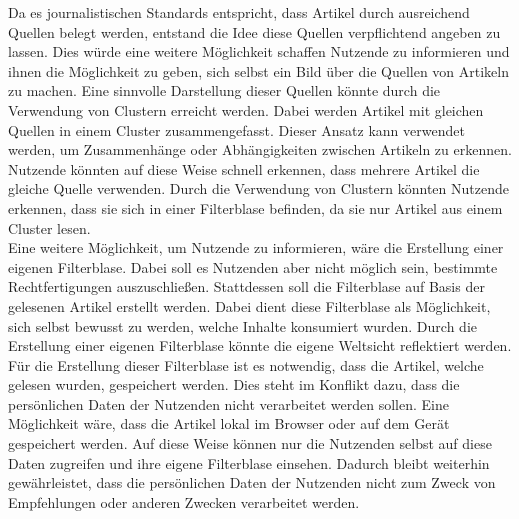 Da es journalistischen Standards entspricht, dass Artikel durch ausreichend Quellen belegt werden, entstand die Idee diese Quellen verpflichtend angeben zu lassen.
Dies würde eine weitere Möglichkeit schaffen Nutzende zu informieren und ihnen die Möglichkeit zu geben, sich selbst ein Bild über die Quellen von Artikeln zu machen.
Eine sinnvolle Darstellung dieser Quellen könnte durch die Verwendung von Clustern erreicht werden.
Dabei werden Artikel mit gleichen Quellen in einem Cluster zusammengefasst.
Dieser Ansatz kann verwendet werden, um Zusammenhänge oder Abhängigkeiten zwischen Artikeln zu erkennen.
Nutzende könnten auf diese Weise schnell erkennen, dass mehrere Artikel die gleiche Quelle verwenden.
Durch die Verwendung von Clustern könnten Nutzende erkennen, dass sie sich in einer Filterblase befinden, da sie nur Artikel aus einem Cluster lesen. \\

Eine weitere Möglichkeit, um Nutzende zu informieren, wäre die Erstellung einer eigenen Filterblase.
Dabei soll es Nutzenden aber nicht möglich sein, bestimmte Rechtfertigungen auszuschließen.
Stattdessen soll die Filterblase auf Basis der gelesenen Artikel erstellt werden.
Dabei dient diese Filterblase als Möglichkeit, sich selbst bewusst zu werden, welche Inhalte konsumiert wurden.
Durch die Erstellung einer eigenen Filterblase könnte die eigene Weltsicht reflektiert werden.
Für die Erstellung dieser Filterblase ist es notwendig, dass die Artikel, welche gelesen wurden, gespeichert werden.
Dies steht im Konflikt dazu, dass die persönlichen Daten der Nutzenden nicht verarbeitet werden sollen.
Eine Möglichkeit wäre, dass die Artikel lokal im Browser oder auf dem Gerät gespeichert werden.
Auf diese Weise können nur die Nutzenden selbst auf diese Daten zugreifen und ihre eigene Filterblase einsehen.
Dadurch bleibt weiterhin gewährleistet, dass die persönlichen Daten der Nutzenden nicht zum Zweck von Empfehlungen oder anderen Zwecken verarbeitet werden.\\
